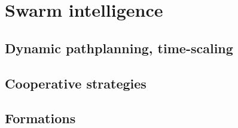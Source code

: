 \section{Swarm intelligence}

\subsection{Dynamic pathplanning, time-scaling}

\subsection{Cooperative strategies}

\subsection{Formations}